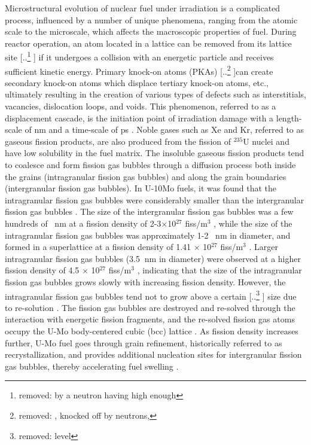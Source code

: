 \documentclass[preprint,12pt]{elsarticle}
\providecommand{\DIFadd}[1]{{\protect\color{blue} \sf #1}} %
\providecommand{\DIFdel}[1]{{\protect\color{red} [..\footnote{removed: #1} ]}} %
\providecommand{\DIFaddbegin}{} %
\providecommand{\DIFaddend}{} %
\providecommand{\DIFdelbegin}{} %
\providecommand{\DIFdelend}{} %
\newcommand{\DIFscaledelfig}{0.5}
\newlength{\DIFdelgraphicswidth} %
\newlength{\DIFdelgraphicsheight} %
\newcommand{\DIFaddincludegraphics}[2][]{{\color{blue}\fbox{\DIFOincludegraphics[#1]{#2}}}} %
\newcommand{\DIFdelincludegraphics}[2][]{%
\sbox{\DIFdelgraphicsbox}{\DIFOincludegraphics[#1]{#2}}%
\settoboxwidth{\DIFdelgraphicswidth}{\DIFdelgraphicsbox} %
\settoboxtotalheight{\DIFdelgraphicsheight}{\DIFdelgraphicsbox} %
\scalebox{\DIFscaledelfig}{%
\parbox[b]{\DIFdelgraphicswidth}{\usebox{\DIFdelgraphicsbox}\\[-\baselineskip] \rule{\DIFdelgraphicswidth}{0em}}\llap{\resizebox{\DIFdelgraphicswidth}{\DIFdelgraphicsheight}{%
\setlength{\unitlength}{\DIFdelgraphicswidth}%
\begin{picture}(1,1)%
\thicklines\linethickness{2pt} %
{\color[rgb]{1,0,0}\put(0,0){\framebox(1,1){}}}%
{\color[rgb]{1,0,0}\put(0,0){\line( 1,1){1}}}%
{\color[rgb]{1,0,0}\put(0,1){\line(1,-1){1}}}%
\end{picture}%
}\hspace*{3pt}}} %
} %
\DeclareRobustCommand{\DIFaddbegin}{\DIFOaddbegin \let\includegraphics\DIFaddincludegraphics} %
\DeclareRobustCommand{\DIFaddend}{\DIFOaddend \let\includegraphics\DIFOincludegraphics} %
\DeclareRobustCommand{\DIFdelbegin}{\DIFOdelbegin \let\includegraphics\DIFdelincludegraphics} %
\DeclareRobustCommand{\DIFdelend}{\DIFOaddend \let\includegraphics\DIFOincludegraphics} %
\begin{document}
\indent Microstructural evolution of nuclear fuel under irradiation is a complicated process, influenced by a number of unique phenomena, ranging from the atomic scale to the microscale, which affects the macroscopic properties of fuel. During reactor operation, an atom located in a lattice can be removed from its lattice site \DIFdelbegin \DIFdel{by a neutron having high enough }\DIFdelend \DIFaddbegin \DIFadd{if it undergoes a collision with an energetic particle and receives sufficient kinetic }\DIFaddend energy. Primary knock-on atoms (PKAs) \DIFdelbegin \DIFdel{, knocked off by neutrons, }\DIFdelend can create secondary knock-on atoms which displace tertiary knock-on atoms, etc., ultimately resulting in \DIFaddbegin \DIFadd{the }\DIFaddend creation of various types of defects such as interstitials, vacancies, dislocation loops, and voids. This phenomenon, referred to as a displacement cascade, is the initiation point of irradiation damage with a length-scale of nm and a time-scale of ps \cite{nordlund2018primary}. Noble gases such as Xe and Kr, referred to as gaseous fission products, are also produced from the fission of $^{235}$U nuclei and have low solubility in the fuel matrix. The insoluble gaseous fission products tend to coalesce and form fission gas bubbles through a diffusion process both inside the grains (intragranular fission gas bubbles) and along the grain boundaries (intergranular fission gas bubbles). In U-10Mo fuels, it was found that the intragranular fission gas bubbles were considerably smaller than the intergranular fission gas bubbles \DIFaddbegin \DIFadd{\cite{kim2011fission, kim2008characterization, van2008transmission}}\DIFaddend . The size of the intergranular fission gas bubbles was a few hundreds of \SI{}{\nano\metre} at a fission density of 2-3$\times$10$^{27}$ fiss/m$^{3}$ \cite{kim2011fission, kim2008characterization}, while the size of the intragranular fission gas bubbles was approximately 1-2 \SI{}{\nano\metre} in diameter, and formed in a superlattice at a fission density of 1.41 $\times$ 10$^{27}$ fiss/m$^{3}$ \cite{van2008transmission}. Larger intragranular fission gas bubbles (3.5 $\SI{}{\nano\metre}$ in diameter) were observed at a higher fission density of 4.5 $\times$ 10$^{27}$ fiss/m$^{3}$ \cite{gan2010transmission}, indicating that the size of the intragranular fission gas bubbles grows slowly with increasing fission density. However, the intragranular fission gas bubbles tend not to grow above a certain \DIFdelbegin \DIFdel{level }\DIFdelend \DIFaddbegin \DIFadd{size }\DIFaddend due to re-solution \cite{olander2006re}. The fission gas bubbles are destroyed and re-solved through the interaction with energetic fission fragments, and the re-solved fission gas atoms occupy the U-Mo body-centered cubic (bcc) lattice \cite{olander2006re}. As fission density increases further, U-Mo fuel goes through grain refinement, historically referred to as recrystallization, and provides additional nucleation sites for intergranular fission gas bubbles, thereby accelerating fuel swelling \cite{rest2005model, kim2013recrystallization, liang2016mesoscale}.
\end{document}
